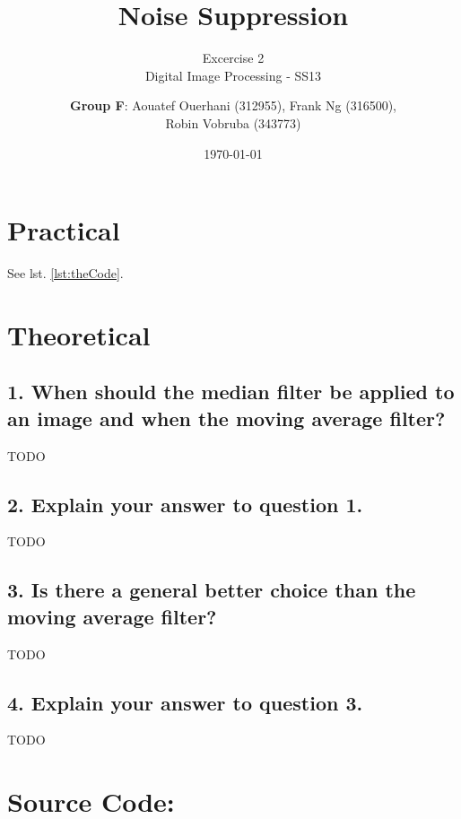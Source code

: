 \documentclass[a4paper,headings=small]{scrartcl}
\title{Noise Suppression}
\subtitle{Excercise 2 \\ Digital Image Processing - SS13}
\author{\textbf{Group F}: Aouatef Ouerhani (312955), Frank Ng (316500),\\ Robin Vobruba (343773)}
\date{\today}
\numberwithin{equation}{section} %
\numberwithin{figure}{section}   %
\begin{document}
\maketitle

\section{Practical}

See lst. \ref{lst:theCode}.


\section{Theoretical}

\subsection{1. When should the median filter be applied to an image and when the moving average filter?}

TODO

\subsection{2. Explain your answer to question 1.}

TODO

\subsection{3. Is there a general better choice than the moving average filter?}

TODO

\subsection{4. Explain your answer to question 3.}

TODO


\newpage
\section{Source Code:}


\end{document}
